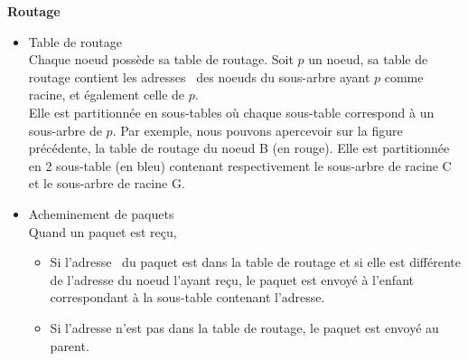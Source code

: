         \textbf{Routage}\newline
        \begin{itemize}
            \item Table de routage\\
                Chaque noeud possède sa table de routage. Soit $p$ un noeud, sa table de routage contient les adresses \mac\ 
                des noeuds du sous-arbre ayant $p$ comme racine, et également celle de $p$.\\
                Elle est partitionnée en sous-tables où chaque sous-table correspond à un sous-arbre de $p$.
                Par exemple, nous pouvons apercevoir sur la figure précédente, la table de routage du noeud B (en rouge).
                Elle est partitionnée en 2 sous-table (en bleu) contenant respectivement le sous-arbre de racine C et le sous-arbre de racine G.
            \item Acheminement de paquets\\
                Quand un paquet est reçu,
                \begin{itemize}
                    \item Si l'adresse \mac\ du paquet est dans la table de routage et si elle est différente de l'adresse du noeud l'ayant reçu, le paquet est envoyé
                    à l'enfant correspondant à la sous-table contenant l'adresse.
                    \item Si l'adresse n'est pas dans la table de routage, le paquet est envoyé au parent.
                \end{itemize}

        \end{itemize}
        \vspace{0.5cm}

